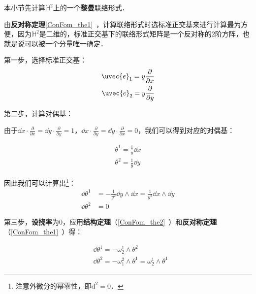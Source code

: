
本小节先计算$\mathbb{H}^2$上的一个\textbf{黎曼}联络形式．

由\textbf{反对称定理}\autoref{ConFom_the1}~，计算联络形式时选标准正交基来进行计算最为方便，因为$\mathbb{H}^2$是二维的，标准正交基下的联络形式矩阵是一个反对称的$2$阶方阵，也就是说可以被一个分量唯一确定．

第一步，选择标准正交基：
\begin{equation}
\begin{aligned}
\uvec{e}_1=y\frac{\partial}{\partial x}\\
\uvec{e}_2=y\frac{\partial}{\partial y}
\end{aligned}
\end{equation}

第二步，计算对偶基：

由于$\dd x\cdot \frac{\partial }{\partial x}=\dd y\cdot \frac{\partial}{\partial y}=1$，$\dd x\cdot \frac{\partial }{\partial y}=\dd y\cdot \frac{\partial}{\partial x}=0$，我们可以得到对应的对偶基：

\begin{equation}\label{PoiHP_eq1}
\begin{aligned}
\theta^1=\frac{1}{y}\dd x\\
\theta^2=\frac{1}{y}\dd y
\end{aligned}
\end{equation}

因此我们可以计算出\footnote{注意外微分的幂零性，即$\mathrm{d}^2=0$．}：
\begin{equation}\label{PoiHP_eq2}
\begin{aligned}
\dd\theta^1&=-\frac{1}{y^2}\dd y\wedge\dd x=\frac{1}{y^2}\dd x\wedge \dd y\\
\dd\theta^2&=0
\end{aligned}
\end{equation}

第三步，\textbf{设挠率}为$0$，应用\textbf{结构定理}（\autoref{ConFom_the2}~）和\textbf{反对称定理}（\autoref{ConFom_the1}~）得：

\begin{equation}\label{PoiHP_eq3}
\begin{aligned}
&\dd\theta^1=-\omega^1_2\wedge\theta^2\\
&\dd\theta^2=-\omega^2_1\wedge\theta^1=\omega^1_2\wedge\theta^1
\end{aligned}
\end{equation}




